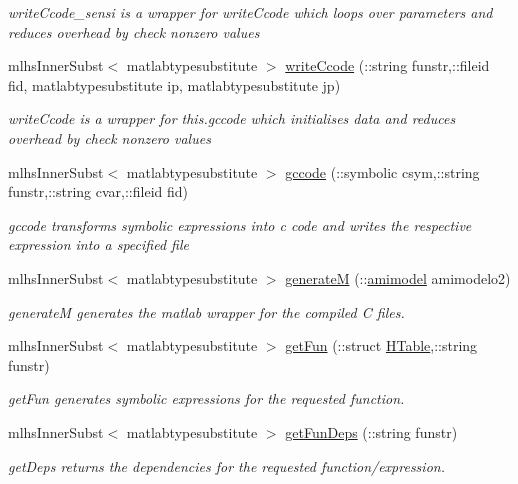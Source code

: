 \begin{DoxyCompactItemize}
\begin{DoxyCompactList}\small\item\em write\+Ccode\+\_\+sensi is a wrapper for write\+Ccode which loops over parameters and reduces overhead by check nonzero values \end{DoxyCompactList}\item 
mlhs\+Inner\+Subst$<$ matlabtypesubstitute $>$ \hyperlink{classamimodel_a874862825ea3346f977f518072dec051}{write\+Ccode} (\+::string funstr,\+::fileid fid, matlabtypesubstitute ip, matlabtypesubstitute jp)
\begin{DoxyCompactList}\small\item\em write\+Ccode is a wrapper for this.\+gccode which initialises data and reduces overhead by check nonzero values \end{DoxyCompactList}\item 
mlhs\+Inner\+Subst$<$ matlabtypesubstitute $>$ \hyperlink{classamimodel_aca8ccaf522a4aadb4ce12b7b636570b2}{gccode} (\+::symbolic csym,\+::string funstr,\+::string cvar,\+::fileid fid)
\begin{DoxyCompactList}\small\item\em gccode transforms symbolic expressions into c code and writes the respective expression into a specified file \end{DoxyCompactList}\item 
mlhs\+Inner\+Subst$<$ matlabtypesubstitute $>$ \hyperlink{classamimodel_a1b75344ed773e2c5c1b76b8a97861234}{generate\+M} (\+::\hyperlink{classamimodel}{amimodel} amimodelo2)
\begin{DoxyCompactList}\small\item\em generate\+M generates the matlab wrapper for the compiled C files. \end{DoxyCompactList}\item 
mlhs\+Inner\+Subst$<$ matlabtypesubstitute $>$ \hyperlink{classamimodel_a73f1b1b08350475e8d854d1a7f1944e1}{get\+Fun} (\+::struct \hyperlink{classamimodel_aafe6335df413dd688a2f44efba012cf1}{H\+Table},\+::string funstr)
\begin{DoxyCompactList}\small\item\em get\+Fun generates symbolic expressions for the requested function. \end{DoxyCompactList}\item 
mlhs\+Inner\+Subst$<$ matlabtypesubstitute $>$ \hyperlink{classamimodel_ab2be9a8b5a1467cc7c4a5bcd651c209e}{get\+Fun\+Deps} (\+::string funstr)
\begin{DoxyCompactList}\small\item\em get\+Deps returns the dependencies for the requested function/expression. \end{DoxyCompactList}\item 

\end{DoxyCompactItemize}

